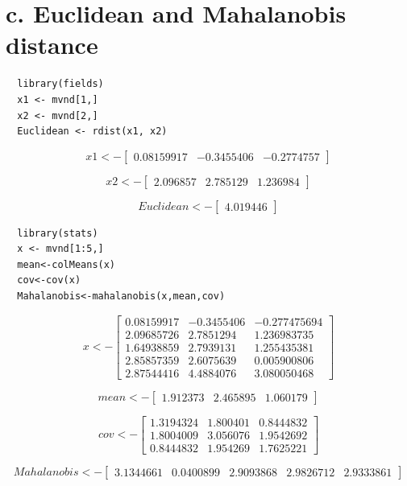 \documentclass{report}
\begin{document}
\section{c. Euclidean and Mahalanobis distance}

\begin{verbatim}
  library(fields)
  x1 <- mvnd[1,]
  x2 <- mvnd[2,]
  Euclidean <- rdist(x1, x2)
\end{verbatim}

\[
  x1 <-
  \begin{bmatrix}
    0.08159917 & -0.3455406 & -0.2774757
  \end{bmatrix}
\]

\[
  x2 <-
  \begin{bmatrix}
    2.096857 & 2.785129 & 1.236984
  \end{bmatrix}
\]

\[
  Euclidean <-
  \begin{bmatrix}
    4.019446
  \end{bmatrix}
\]

\begin{verbatim}
  library(stats)
  x <- mvnd[1:5,]
  mean<-colMeans(x)
  cov<-cov(x)
  Mahalanobis<-mahalanobis(x,mean,cov) 
\end{verbatim}

\[
  x <-
  \begin{bmatrix}
    0.08159917 & -0.3455406 & -0.277475694 \\
    2.09685726 & 2.7851294 & 1.236983735 \\
    1.64938859 & 2.7939131 & 1.255435381 \\
    2.85857359 & 2.6075639 & 0.005900806 \\
    2.87544416 & 4.4884076 & 3.080050468
  \end{bmatrix}
\]

\[
  mean <-
  \begin{bmatrix}
    1.912373 & 2.465895 & 1.060179
  \end{bmatrix}
\]

\[
  cov <-
  \begin{bmatrix}
    1.3194324 & 1.800401 & 0.8444832 \\
    1.8004009 & 3.056076 & 1.9542692 \\
    0.8444832 & 1.954269 & 1.7625221
  \end{bmatrix}
\]

\[
  Mahalanobis <-
  \begin{bmatrix}
    3.1344661 & 0.0400899 & 2.9093868 & 2.9826712 & 2.9333861
  \end{bmatrix}
\]
\end{document}
